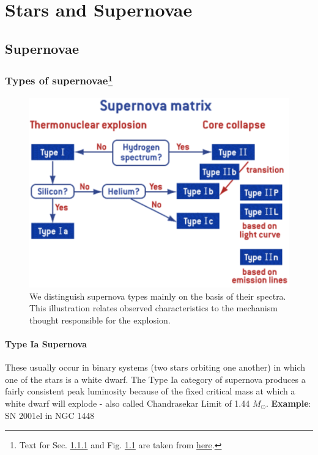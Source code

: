 \chapter{Stars and Supernovae}



\section{Supernovae}


\subsection{Types of supernovae\footnote{Text for Sec. \ref{SNTypes} and Fig. \ref{fig:supernova} are taken from 
 \href{https://astronomy.com/magazine/2004/08/know-your-supernovae}{here}.}} \label{SNTypes}

\begin{figure}[!h]
    \centering
    \includegraphics[scale=0.6]{Notes_Images/Supernovae.png}
    \caption{We distinguish supernova types mainly on the basis of their spectra. This illustration relates observed characteristics to the mechanism thought responsible for the explosion.}
    \label{fig:supernova}
\end{figure}

\subsubsection{Type Ia Supernova}

These usually occur in binary systems (two stars orbiting one another) in which one of the stars is a white dwarf. The Type Ia category of supernova produces a fairly consistent peak luminosity because of the fixed critical mass at which a white dwarf will explode - also called Chandrasekar Limit of 1.44 $M_{\odot}$. \textbf{Example}: SN 2001el in NGC 1448

